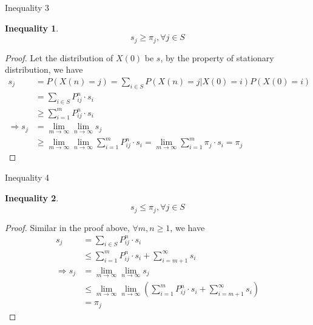 \documentclass[mathserif]{beamer}
\newtheorem{ineq}{Inequality}
\begin{document}
\begin{frame}{Inequality 3}
	\begin{ineq}
		\[
		s_j \geq \pi_j, \forall j \in S
		\]
	\end{ineq}
\end{frame}

\begin{frame}
	\begin{proof}
		Let the distribution of $X(0)$ be $s$, by the property of stationary distribution, we have
		\begin{align*}
			             s_j &= P(X(n)=j) = \sum_{i \in S} P(X(n) = j | X(0) = i)P(X(0) = i) \\
			                 &= \sum_{i \in S} P^n_{ij} \cdot s_i \\
			                 &\geq \sum_{i=1}^m P^n_{ij} \cdot s_i \\
			\Rightarrow  s_j &= \lim_{m \to \infty}\lim_{n \to \infty} s_j \\
			                 &\geq \lim_{m \to \infty}\lim_{n \to \infty} \sum_{i=1}^m P^n_{ij} \cdot s_i
			                  = \lim_{m \to \infty}\sum_{i=1}^m \pi_j \cdot s_i = \pi_j
		\end{align*}
	\end{proof}
\end{frame}

\begin{frame}{Inequality 4}
	\begin{ineq}
		\[
		s_j \leq \pi_j, \forall j \in S
		\]
	\end{ineq}
\end{frame}

\begin{frame}
	\begin{proof}
		Similar in the proof above, $\forall m,n \geq 1$, we have
		\begin{align*}
			            s_j &= \sum_{i \in S} P^n_{ij} \cdot s_i \\
			                &\leq \sum_{i=1}^m P^n_{ij} \cdot s_i + \sum_{i=m+1}^\infty s_i \\
			\Rightarrow s_j &= \lim_{m \to \infty}\lim_{n \to \infty} s_j \\
			                &\leq \lim_{m \to \infty}\lim_{n \to \infty} \left( 
			                	\sum_{i=1}^m P^n_{ij} \cdot s_i + \sum_{i=m+1}^\infty s_i \right) \\
			                &= \pi_j
		\end{align*}
	\end{proof}
\end{frame}
\end{document}
